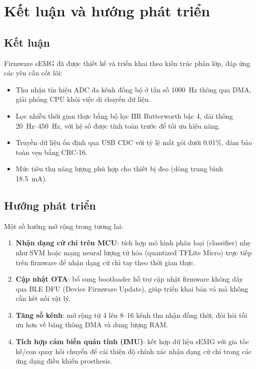 \chapter{Kết luận và hướng phát triển}
\label{ch:conclusion}

\section{Kết luận}

Firmware sEMG đã được thiết kế và triển khai theo kiến trúc phân lớp, đáp ứng các yêu cầu cốt lõi:

\begin{itemize}
    \item Thu nhận tín hiệu ADC đa kênh đồng bộ ở tần số \SI{1000}{Hz} thông qua DMA, giải phóng CPU khỏi việc di chuyển dữ liệu.
    \item Lọc nhiễu thời gian thực bằng bộ lọc IIR Butterworth bậc 4, dải thông \SIrange{20}{450}{Hz}, với hệ số được tính toán trước để tối ưu hiệu năng.
    \item Truyền dữ liệu ổn định qua USB CDC với tỷ lệ mất gói dưới 0.01\%, đảm bảo toàn vẹn bằng CRC-16.
    \item Mức tiêu thụ năng lượng phù hợp cho thiết bị đeo (dòng trung bình \SI{18.5}{mA}).
\end{itemize}

\section{Hướng phát triển}

Một số hướng mở rộng trong tương lai:

\begin{enumerate}
    \item \textbf{Nhận dạng cử chỉ trên MCU}: tích hợp mô hình phân loại (classifier) nhẹ như SVM hoặc mạng neural lượng tử hóa (quantized TFLite Micro) trực tiếp trên firmware để nhận dạng cử chỉ tay theo thời gian thực.
    \item \textbf{Cập nhật OTA}: bổ sung bootloader hỗ trợ cập nhật firmware không dây qua BLE DFU (Device Firmware Update), giúp triển khai bản vá mà không cần kết nối vật lý.
    \item \textbf{Tăng số kênh}: mở rộng từ 4 lên 8--16 kênh thu nhận đồng thời, đòi hỏi tối ưu hơn về băng thông DMA và dung lượng RAM.
    \item \textbf{Tích hợp cảm biến quán tính (IMU)}: kết hợp dữ liệu sEMG với gia tốc kế/con quay hồi chuyển để cải thiện độ chính xác nhận dạng cử chỉ trong các ứng dụng điều khiển prosthesis.
\end{enumerate}
